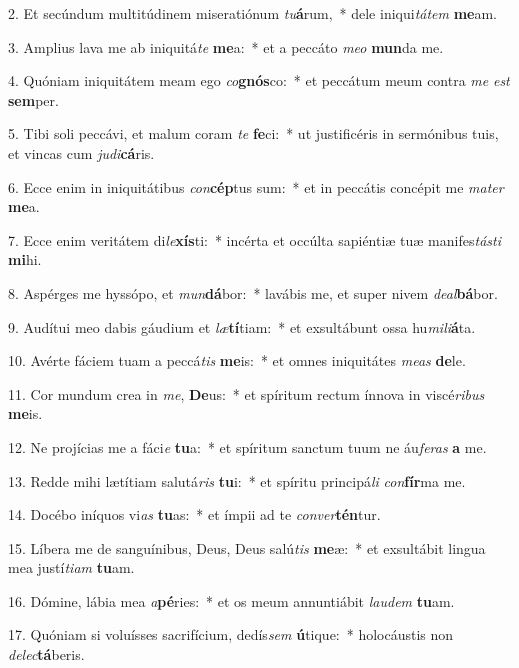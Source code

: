 2. Et secúndum multitúdinem miseratiónum \textit{tu}\textbf{á}rum,~*  dele iniqui\textit{tá}\textit{tem} \textbf{me}am.\

3. Amplius lava me ab iniquitá\textit{te} \textbf{me}a:~*  et a peccáto \textit{me}\textit{o} \textbf{mun}da me.\

4. Quóniam iniquitátem meam ego \textit{co}\textbf{gnós}co:~*  et peccátum meum contra \textit{me} \textit{est} \textbf{sem}per.\

5. Tibi soli peccávi, et malum coram \textit{te} \textbf{fe}ci:~*  ut justificéris in sermónibus tuis, et vincas cum \textit{ju}\textit{di}\textbf{cá}ris.\

6. Ecce enim in iniquitátibus \textit{con}\textbf{cép}tus sum:~*  et in peccátis concépit me \textit{ma}\textit{ter} \textbf{me}a.\

7. Ecce enim veritátem di\textit{le}\textbf{xís}ti:~*  incérta et occúlta sapiéntiæ tuæ manifes\textit{tás}\textit{ti} \textbf{mi}hi.\

8. Aspérges me hyssópo, et \textit{mun}\textbf{dá}bor:~*  lavábis me, et super nivem \textit{de}\textit{al}\textbf{bá}bor.\

9. Audítui meo dabis gáudium et \textit{læ}\textbf{tí}tiam:~*  et exsultábunt ossa hu\textit{mi}\textit{li}\textbf{á}ta.\

10. Avérte fáciem tuam a peccá\textit{tis} \textbf{me}is:~*  et omnes iniquitátes \textit{me}\textit{as} \textbf{de}le.\

11. Cor mundum crea in \textit{me}, \textbf{De}us:~*  et spíritum rectum ínnova in viscé\textit{ri}\textit{bus} \textbf{me}is.\

12. Ne projícias me a fáci\textit{e} \textbf{tu}a:~*  et spíritum sanctum tuum ne áu\textit{fe}\textit{ras} \textbf{a} me.\

13. Redde mihi lætítiam salutá\textit{ris} \textbf{tu}i:~*  et spíritu principá\textit{li} \textit{con}\textbf{fír}ma me.\

14. Docébo iníquos vi\textit{as} \textbf{tu}as:~*  et ímpii ad te \textit{con}\textit{ver}\textbf{tén}tur.\

15. Líbera me de sanguínibus, Deus, Deus salú\textit{tis} \textbf{me}æ:~*  et exsultábit lingua mea justí\textit{ti}\textit{am} \textbf{tu}am.\

16. Dómine, lábia mea \textit{a}\textbf{pé}ries:~*  et os meum annuntiábit \textit{lau}\textit{dem} \textbf{tu}am.\

17. Quóniam si voluísses sacrifícium, dedís\textit{sem} \textbf{ú}tique:~*  holocáustis non \textit{de}\textit{lec}\textbf{tá}beris.\

